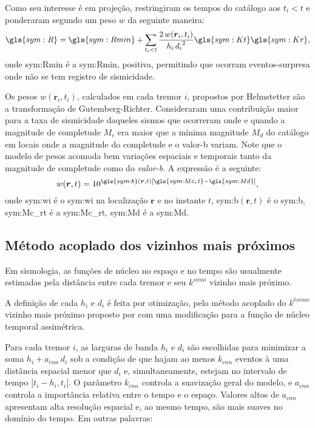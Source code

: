 Como seu interesse é em projeção, restringiram os tempos do catálogo aos $t_i
< t$ e ponderaram segundo um peso $w$ da seguinte maneira:
\begin{equation}
\ensuremath{\gls{sym:R} = \gls{sym:Rmin} + \sum_{t_i < t}{ 
	\frac{2\,w(\boldsymbol{r}_i,t_i)}{h_i\,{d_i}^2}
			\gls{sym:Kt}\gls{sym:Kr} }},
	\label{eq:helms02}
\end{equation}
onde \gls{sym:Rmin} é a \glsdesc{sym:Rmin}, positiva, permitindo que ocorram eventos-surpresa 
onde não se tem registro de sismicidade.

Os pesos $w(\boldsymbol{r}_i,t_i)$, calculados em cada tremor $i$, propostos por Helmstetter são a transformação de
Gutemberg-Richter. Consideraram uma contribuição maior para a taxa de sismicidade daqueles sismos 
que ocorreram onde e quando a magnitude de completude $M_c$ era maior que 
a mínima magnitude $M_d$ do catálogo 
em locais onde a magnitude do completude e o valor-b variam. 
Note que o modelo de pesos acomoda bem variações espaciais e
temporais tanto da magnitude de completude como do \emph{valor-b}. A expressão é a seguinte:
\begin{equation}
	\ensuremath{ w(\boldsymbol{r},t) = 10^{ \gls{sym:b}(\boldsymbol{r},t) \left[ \gls{sym:Mc_rt} - \gls{sym:Md}
	\right] } },
	\label{eq:helms_wi}
\end{equation}
onde  \gls{sym:wi} é o \glsdesc{sym:wi} na localização $\boldsymbol{r}$ e no instante $t$, 
	  \gls{sym:b}$(\boldsymbol{r},t)$ é o \glsdesc{sym:b}, 
	  \gls{sym:Mc_rt} é a \glsdesc{sym:Mc_rt}, 
	  \gls{sym:Md} é a \glsdesc{sym:Md}.

\subsection{Método acoplado dos vizinhos mais próximos}

Em sismologia, as funções de núcleo no espaço e no tempo são usualmente estimadas
pela distância entre cada tremor e seu $k^{simo}$ vizinho mais próximo. 

A definição de cada $h_i$ e $d_i$ é feita por otimização, 
pelo método acoplado do $k^{ésimo}$ vizinho mais próximo
proposto por \citet{choi_1999}
com uma modificação para a função de núcleo temporal assimétrica.

Para cada tremor $i$, as larguras de banda  $h_i$ e $d_i$ são escolhidas para
minimizar a soma $h_i + a_{cnn}\,d_i$ sob a condição de que hajam ao menos $k_{cnn}$
eventos à uma distância espacial menor que $d_i$ e, simultaneamente, estejam
no intervalo de tempo $[t_i - h_i, t_i[$. O parâmetro $k_{cnn}$ controla a suavização 
geral do modelo, e $a_{cnn}$ controla a importância relativa entre o tempo e o espaço.
Valores altos de $a_{cnn}$ apresentam alta resolução espacial e, ao mesmo tempo, 
são mais suaves no domínio do tempo. Em outras palavras:


